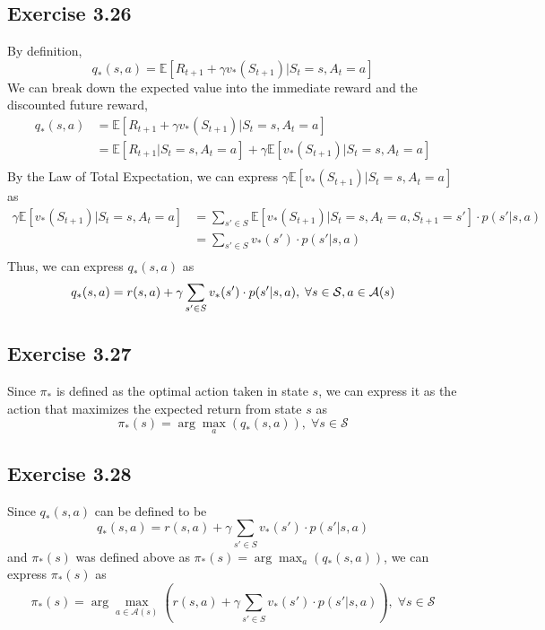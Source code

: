 \documentclass{article}
\begin{document}
\subsection*{Exercise 3.26}
By definition,
\begin{equation*}
    q_{*}(s,a) = \mathbb{E}[R_{t+1} + \gamma v_{*}(S_{t+1})|S_t=s, A_t=a]
\end{equation*}
We can break down the expected value into the immediate reward and the discounted future reward,
\begin{equation*}
    \begin{aligned}
        q_{*}(s,a) &= \mathbb{E}[R_{t+1} + \gamma v_{*}(S_{t+1})|S_t=s, A_t=a]\\
        &= \mathbb{E}[R_{t+1}|S_t=s, A_t=a] + \gamma \mathbb{E}[v_{*}(S_{t+1})|S_t=s, A_t=a]\\
    \end{aligned}
\end{equation*}
By the Law of Total Expectation, we can express $\gamma \mathbb{E}[v_{*}(S_{t+1})|S_t=s, A_t=a]$ as
\begin{equation*}
    \begin{aligned}
        \gamma \mathbb{E}[v_{*}(S_{t+1})|S_t=s, A_t=a] &= \sum_{s'\in S} \mathbb{E}[v_{*}(S_{t+1})|S_t=s, A_t=a, S_{t+1}=s']\cdot p(s'|s,a)\\
        &= \sum_{s'\in S} v_{*}(s')\cdot p(s'|s,a)\\
    \end{aligned}
\end{equation*}
Thus, we can express $q_{*}(s,a)$ as
\begin{equation*}
    q_{*}(s,a) = r(s,a) + \gamma \sum_{s'\in S} v_{*}(s')\cdot p(s'|s,a),\; \forall s \in \mathcal{S}, a \in \mathcal{A}(s)\\
\end{equation*}
\subsection*{Exercise 3.27}
Since $\pi_{*}$ is defined as the optimal action taken in state $s$, we can express it as the action that maximizes the expected return from state $s$ as 
\begin{equation*}
    \pi_{*}(s) = \arg\max_{a}(q_{*}(s,a)),\; \forall s \in \mathcal{S}
\end{equation*}
\subsection*{Exercise 3.28}
Since $q_{*}(s,a)$ can be defined to be 
\begin{equation*}
    q_{*}(s,a) = r(s,a) + \gamma \sum_{s'\in S} v_{*}(s')\cdot p(s'|s,a)
\end{equation*}
and $\pi_{*}(s)$ was defined above as $\pi_{*}(s)=\arg\max_{a}(q_{*}(s,a))$, we can express $\pi_{*}(s)$ as
\begin{equation*}
    \pi_{*}(s) = \arg\max_{a \in \mathcal{A}(s)}\left(r(s,a) + \gamma \sum_{s'\in S} v_{*}(s')\cdot p(s'|s,a)\right),\; \forall s \in \mathcal{S}
\end{equation*}
\end{document}
